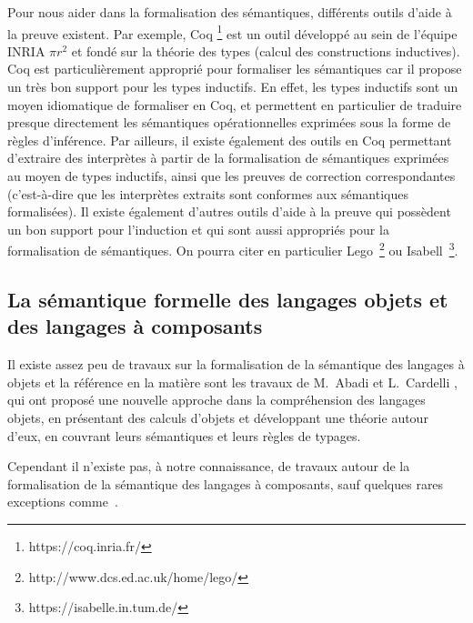        Pour nous aider dans la formalisation des sémantiques, différents outils d'aide à la preuve existent. Par exemple, Coq \footnote{https://coq.inria.fr/} est un outil développé au sein de l’équipe INRIA $\pi$$r^{2}$ et fondé sur la théorie des types (calcul des constructions inductives). Coq est particulièrement approprié pour formaliser les sémantiques car il propose un très bon support pour les types inductifs. En effet, les types inductifs sont un moyen idiomatique de formaliser en Coq, et permettent en particulier de traduire presque directement les sémantiques opérationnelles exprimées sous la forme de règles d'inférence. Par ailleurs, il existe également des outils en Coq \cite{Rel-Exec3} permettant d'extraire des interprètes à partir de la formalisation de sémantiques exprimées au moyen de types inductifs, ainsi que les preuves de correction correspondantes (c'est-à-dire que les interprètes extraits sont conformes aux sémantiques formalisées). Il existe également d'autres outils d'aide à la preuve qui possèdent un bon support pour l'induction et qui sont aussi appropriés pour la formalisation de sémantiques. On pourra citer en particulier Lego~\footnote{http://www.dcs.ed.ac.uk/home/lego/} ou Isabell~\footnote{https://isabelle.in.tum.de/}.
        
  \subsection{La sémantique formelle des langages objets et des langages à composants}
  
       Il existe assez peu de travaux sur la formalisation de la sémantique des langages à objets et la référence en la matière sont les travaux de M.~Abadi et L.~Cardelli \cite{Abadi:1996:TO:547964}, qui ont proposé une nouvelle approche dans la compréhension des langages objets, en présentant des calculs d'objets et développant une théorie  autour d'eux, en couvrant leurs sémantiques et leurs règles de typages.
      
      Cependant il n'existe pas, à notre connaissance, de travaux autour de la formalisation de la sémantique des langages à composants, sauf quelques rares exceptions comme~\cite{peschanski2001typeful}.
        
      

